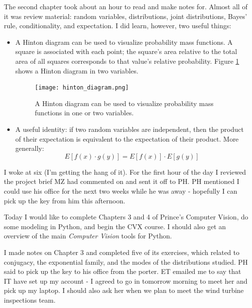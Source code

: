 \documentclass[idxtotoc,hyperref,openany]{labbook} %
\begin{document}
The second chapter took about an hour to read and make notes for. Almost all of it was review material: random variables, distributions, joint distributions, Bayes' rule, conditionality, and expectation. I did learn, however, two useful things:
\begin{itemize}
\item A Hinton diagram can be used to visualize probability mass functions. A square is associated with each point; the square's area relative to the total area of all squares corresponds to that value's relative probability. Figure \ref{fig:hinton_diagram} shows a Hinton diagram in two variables.
\begin{figure}[h!]
\centering
\texttt{[image: hinton\_diagram.png]}
\caption{A Hinton diagram can be used to visualize probability mass functions in one or two variables.}
\label{fig:hinton_diagram}
\end{figure}
\item A useful identity: if two random variables are independent, then the product of their expectation is equivalent to the expectation of their product. More generally:
\begin{equation}
	E[f(x) \cdot g(y)] = E[f(x)] \cdot E[g(y)]
\end{equation}
\end{itemize}



I woke at six (I'm getting the hang of it). For the first hour of the day I reviewed the project brief MZ had commented on and sent it off to PH. PH mentioned I could use his office for the next two weeks while he was away - hopefully I can pick up the key from him this afternoon.

Today I would like to complete Chapters 3 and 4 of Prince's Computer Vision, do some modeling in Python, and begin the CVX course. I should also get an overview of the main \emph{Computer Vision} tools for Python.

I made notes on Chapter 3 and completed five of its exercises, which related to conjugacy, the exponential family, and the modes of the distributions studied. PH said to pick up the key to his office from the porter. ET emailed me to say that IT have set up my account - I agreed to go in tomorrow morning to meet her and pick up my laptop. I should also ask her when we plan to meet the wind turbine inspections team.
\end{document}
